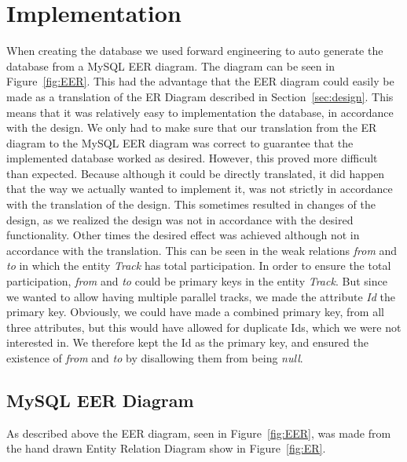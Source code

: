 \section{Implementation} \label{sec:implementation}

When creating the database we used forward engineering to auto generate the 
database from a MySQL EER diagram. The diagram can be seen in 
Figure~\ref{fig:EER}. This had the advantage that the EER diagram could easily 
be made as a translation of the ER Diagram described in 
Section~\ref{sec:design}. This means that it was relatively easy to 
implementation the database, in accordance with the design. We only had to make 
sure that our translation from the ER diagram to the MySQL EER diagram was 
correct to guarantee that the implemented database worked as desired. However, 
this proved more difficult than expected. Because although it could be directly 
translated, it did happen that the way we actually wanted to implement it, was 
not strictly in accordance with the translation of the design. This sometimes 
resulted in changes of the design, as we realized the design was not in 
accordance with the desired functionality. Other times the desired effect was 
achieved although not in accordance with the translation. This can be seen in 
the weak relations \emph{from} and \emph{to} in which the entity \emph{Track} 
has total participation. In order to ensure the total participation, 
\emph{from} and \emph{to} could be primary keys in the entity \emph{Track}. But 
since we wanted to allow having multiple parallel tracks, we made the attribute 
\emph{Id} the primary key. Obviously, we could have made a combined primary 
key, from all three attributes, but this would have allowed for duplicate Ids, 
which we were not interested in. We therefore kept the Id as the primary key, 
and ensured the existence of \emph{from} and \emph{to} by disallowing them from 
being \emph{null}.

\subsection{MySQL EER Diagram}

As described above the EER diagram, seen in Figure~\ref{fig:EER}, was made from 
the hand drawn Entity Relation Diagram show in Figure~\ref{fig:ER}.

